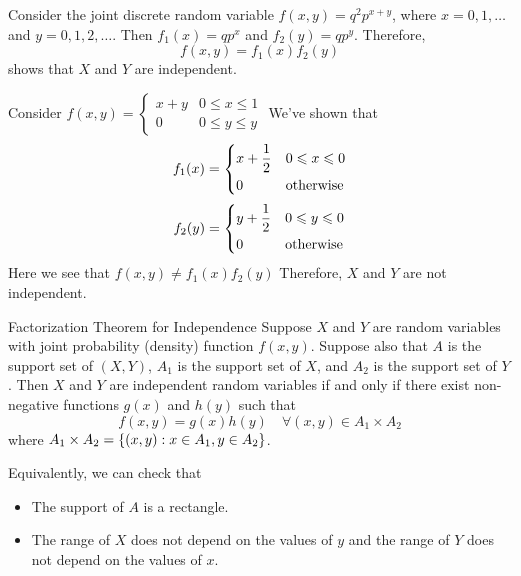 \begin{Example}{}{}
    Consider the joint discrete random variable
    $ f(x,y)=q^2 p^{x+y} $, where $ x=0,1,\ldots $
    and $ y=0,1,2,\ldots $. Then $ f_1(x)=qp^x $
    and $ f_2(y)=qp^y $. Therefore,
    \[ f(x,y)=f_1(x)f_2(y) \]
    shows that $ X $ and $ Y $ are independent.

    Consider $ \displaystyle
        f(x,y)=\begin{cases}
            x+y & 0\leqslant x\leqslant 1 \\
            0   & 0\leqslant y\leqslant y
        \end{cases} $
    We've shown that
    \[ f_1(x)=\begin{dcases}
            x+\frac{1}{2} & 0\leqslant x\leqslant 0 \\
            0             & \text{otherwise}
        \end{dcases} \]
    \[ f_2(y)=\begin{dcases}
            y+\frac{1}{2} & 0\leqslant y\leqslant 0 \\
            0             & \text{otherwise}
        \end{dcases} \]
    Here we see that $ f(x,y)\neq f_1(x)f_2(y) $
    Therefore, $ X $ and $ Y $ are not independent.
\end{Example}

\begin{Theorem}{Factorization Theorem for Independence}{}
    Suppose $ X $ and $ Y $ are random variables
    with joint probability (density) function $ f(x,y) $. Suppose
    also that $ A $ is the support set of $ (X,Y) $,
    $ A_1 $ is the support set of $ X $,
    and $ A_2 $ is the support set of $ Y $. Then
    $ X $ and $ Y $ are independent random variables
    if and only if there exist non-negative functions
    $ g(x) $ and $ h(y) $ such that
    \[ f(x,y)=g(x)h(y)\quad\forall(x,y)\in A_1\times A_2 \]
    where $ A_1\times A_2=\{(x,y):x\in A_1,y\in A_2\} $.
\end{Theorem}
\begin{Remark}{}{}
    Equivalently, we can check that
    \begin{itemize}
        \item The support of $ A $ is a rectangle.
        \item The range of $ X $ does not depend on the values
              of $ y $ and the range of $ Y $ does not depend on the values of $ x $.
    \end{itemize}
\end{Remark}

